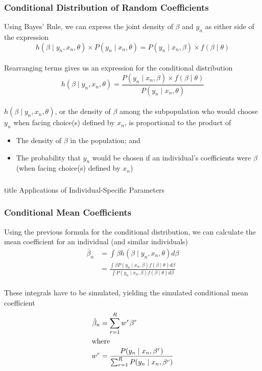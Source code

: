 \documentclass{beamer}\usepackage[]{graphicx}\usepackage[]{color}
\begin{document}
\begin{frame}\frametitle{Conditional Distribution of Random Coefficients}
    Using Bayes' Rule, we can express the joint density of $\beta$ and $y_n$ as either side of the expression
    $$h(\beta \mid y_n, x_n, \theta) \times P(y_n \mid x_n, \theta) = P(y_n \mid x_n, \beta) \times f(\beta \mid \theta)$$ \\
    \vspace{1ex}
    Rearranging terms gives us an expression for the conditional distribution
    $$h(\beta \mid y_n, x_n, \theta) = \frac{P(y_n \mid x_n, \beta) \times f(\beta \mid \theta)}{P(y_n \mid x_n, \theta)}$$ \\
    \vspace{1ex}
    $h(\beta \mid y_n, x_n, \theta)$, or the density of $\beta$ among the subpopulation who would choose $y_n$ when facing choice(s) defined by $x_n$, is proportional to the product of
    \begin{itemize}
    	\item The density of $\beta$ in the population; and
    	\item The probability that $y_n$ would be chosen if an individual's coefficients were $\beta$ (when facing choice(s) defined by $x_n$)
    \end{itemize}
\end{frame}

\begin{frame}\frametitle{}
    \vfill
    \centering
    \begin{beamercolorbox}[center]{title}
        \Large Applications of Individual-Specific Parameters
    \end{beamercolorbox}
    \vfill
\end{frame}

\begin{frame}\frametitle{Conditional Mean Coefficients}
    Using the previous formula for the conditional distribution, we can calculate the mean coefficient for an individual (and similar individuals)
    \begin{align*}
    	\bar{\beta}_n &= \int \beta h(\beta \mid y_n, x_n, \theta) d \beta \\
    	&= \frac{\int \beta P(y_n \mid x_n, \beta) f(\beta \mid \theta) d \beta}{\int P(y_n \mid x_n, \beta) f(\beta \mid \theta) d \beta}
    \end{align*} \\
    \vspace{2ex}
    These integrals have to be simulated, yielding the simulated conditional mean coefficient
    \begin{align*}
    	\check{\beta}_n &= \sum_{r = 1}^R w^r \beta^r \\
    	\intertext{where}
    	w^r &= \frac{P(y_n \mid x_n, \beta^r)}{\sum_{r = 1}^R P(y_n \mid x_n, \beta^r)}
    \end{align*}
\end{frame}
\end{document}
